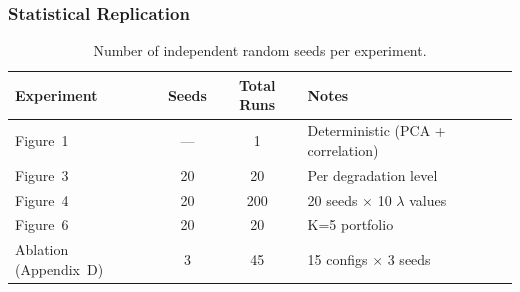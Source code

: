 \subsubsection{Statistical Replication}

\begin{table}[h]
\centering
\caption{Number of independent random seeds per experiment.}
\label{tab:seeds}
\small
\begin{tabular}{@{}lccl@{}}
\toprule
\textbf{Experiment} & \textbf{Seeds} & \textbf{Total Runs} & \textbf{Notes} \\
\midrule
Figure~1 & --- & 1 & Deterministic (PCA + correlation) \\
Figure~3 & 20 & 20 & Per degradation level \\
Figure~4 & 20 & 200 & 20 seeds $\times$ 10 $\lambda$ values \\
Figure~6 & 20 & 20 & K=5 portfolio \\
Ablation (Appendix~D) & 3 & 45 & 15 configs $\times$ 3 seeds \\
\bottomrule
\end{tabular}
\end{table}

